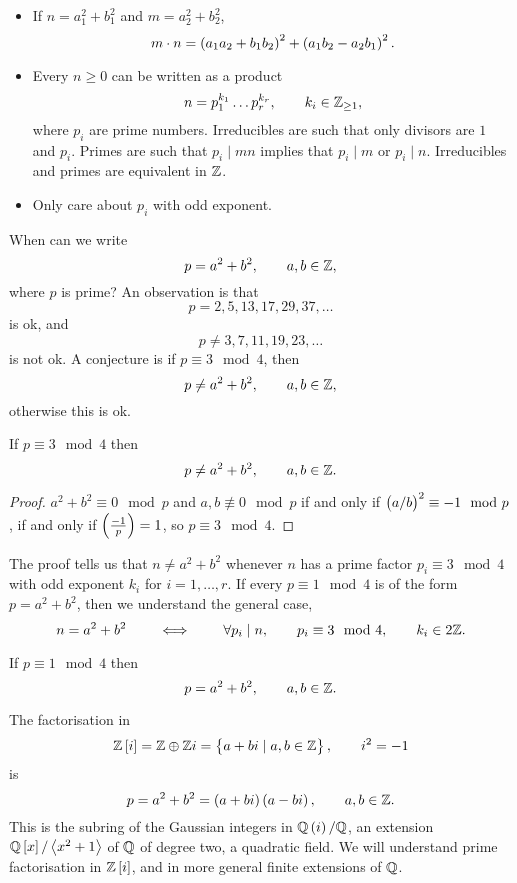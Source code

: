\begin{itemize}
\item If $ n = a_1^2 + b_1^2 $ and $ m = a_2^2 + b_2^2 $,
$$ m \cdot n = \br{a_1a_2 + b_1b_2}^2 + \br{a_1b_2 - a_2b_1}^2. $$
\item Every $ n \ge 0 $ can be written as a product
$$ n = p_1^{k_1} \dots p_r^{k_r}, \qquad k_i \in \mathbb{Z}_{\ge 1}, $$
where $ p_i $ are prime numbers. Irreducibles are such that only divisors are $ 1 $ and $ p_i $. Primes are such that $ p_i \mid mn $ implies that $ p_i \mid m $ or $ p_i \mid n $. Irreducibles and primes are equivalent in $ \mathbb{Z} $.
\item Only care about $ p_i $ with odd exponent.
\end{itemize}

\pagebreak

When can we write
$$ p = a^2 + b^2, \qquad a, b \in \mathbb{Z}, $$
where $ p $ is prime? An observation is that
$$ p = 2, 5, 13, 17, 29, 37, \dots $$
is ok, and
$$ p \ne 3, 7, 11, 19, 23, \dots $$
is not ok. A conjecture is if $ p \equiv 3 \mod 4 $, then
$$ p \ne a^2 + b^2, \qquad a, b \in \mathbb{Z}, $$
otherwise this is ok.

\begin{theorem}
If $ p \equiv 3 \mod 4 $ then
$$ p \ne a^2 + b^2, \qquad a, b \in \mathbb{Z}. $$
\end{theorem}

\begin{proof}
$ a^2 + b^2 \equiv 0 \mod p $ and $ a, b \not\equiv 0 \mod p $ if and only if $ \br{a / b}^2 \equiv -1 \mod p $, if and only if $ \jacobi{-1}{p} = 1 $, so $ p \equiv 3 \mod 4 $.
\end{proof}

\begin{remark*}
The proof tells us that $ n \ne a^2 + b^2 $ whenever $ n $ has a prime factor $ p_i \equiv 3 \mod 4 $ with odd exponent $ k_i $ for $ i = 1, \dots, r $. If every $ p \equiv 1 \mod 4 $ is of the form $ p = a^2 + b^2 $, then we understand the general case,
$$ n = a^2 + b^2 \qquad \iff \qquad \forall p_i \mid n, \qquad p_i \equiv 3 \mod 4, \qquad k_i \in 2\mathbb{Z}. $$
\end{remark*}

\begin{theorem}
If $ p \equiv 1 \mod 4 $ then
$$ p = a^2 + b^2, \qquad a, b \in \mathbb{Z}. $$
\end{theorem}

The factorisation in
$$ \Z\sbr{i} = \Z \oplus \Z i = \cbr{a + bi \mid a, b \in \Z}, \qquad i^2 = -1 $$
is
$$ p = a^2 + b^2 = \br{a + bi}\br{a - bi}, \qquad a, b \in \Z. $$
This is the subring of the Gaussian integers in $ \Q\br{i} / \Q $, an extension $ \Q\sbr{x} / \abr{x^2 + 1} $ of $ \mathbb{Q} $ of degree two, a quadratic field. We will understand prime factorisation in $ \Z\sbr{i} $, and in more general finite extensions of $ \mathbb{Q} $.

